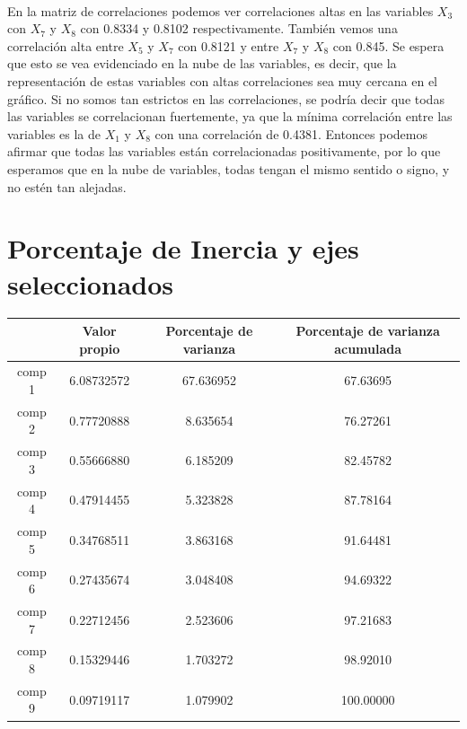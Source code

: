 \documentclass[report,oneside]{revcoles}
\begin{document}
~\\En la matriz de correlaciones podemos ver correlaciones altas en las variables $X_3$ con $X_7$ y $X_8$ con 0.8334 y 0.8102 respectivamente. También vemos una correlación alta entre $X_5$ y $X_7$ con 0.8121 y entre $X_7$ y $X_8$ con 0.845. Se espera que esto se vea evidenciado en la nube de las variables, es decir, que la representación de estas variables con altas correlaciones sea muy cercana en el gráfico. Si no somos tan estrictos en las correlaciones, se podría decir que todas las variables se correlacionan fuertemente, ya que la mínima correlación entre las variables es la de $X_1$ y $X_8$ con una correlación de 0.4381. Entonces podemos afirmar que todas las variables están correlacionadas positivamente, por lo que esperamos que en la nube de variables, todas tengan el mismo sentido o signo, y no estén tan alejadas.


\pagebreak
\section{Porcentaje de Inercia y ejes seleccionados}
\begin{center}
\begin{tabular}{|c|c|c|c|}
\hline 
 & Valor propio & Porcentaje de varianza & Porcentaje de varianza acumulada \\ 
\hline 
comp 1 & 6.08732572     &         67.636952&                          67.63695\\
comp 2 &0.77720888     &          8.635654  &                        76.27261\\
comp 3 &0.55666880    &           6.185209   &                       82.45782\\
comp 4 &0.47914455   &            5.323828    &                      87.78164\\
comp 5 &0.34768511  &             3.863168     &                     91.64481\\
comp 6 &0.27435674 &              3.048408      &                    94.69322\\
comp 7 &0.22712456&               2.523606       &                   97.21683\\
comp 8 &0.15329446&               1.703272        &                  98.92010\\
comp 9 &0.09719117&               1.079902         &                100.00000 \\
\hline 
\end{tabular} 
\end{center}
\end{document}
